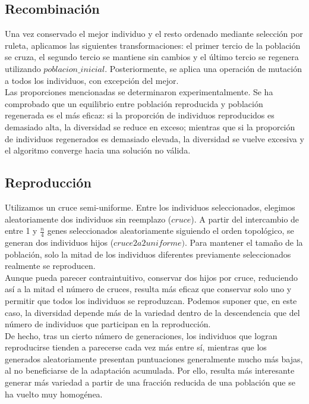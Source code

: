 \documentclass[12pt]{report}
\begin{document}
\subsection{Recombinación}

Una vez conservado el mejor individuo y el resto ordenado mediante selección por ruleta, aplicamos las siguientes transformaciones: el primer tercio de la población se cruza, el segundo tercio se mantiene sin cambios y el último tercio se regenera utilizando $poblacion\_inicial$.
Posteriormente, se aplica una operación de mutación a todos los individuos, con excepción del mejor.\\

Las proporciones mencionadas se determinaron experimentalmente. Se ha comprobado que un equilibrio entre población reproducida y población regenerada es el más eficaz: si la proporción de individuos reproducidos es demasiado alta, la diversidad se reduce en exceso; mientras que si la proporción de individuos regenerados es demasiado elevada, la diversidad se vuelve excesiva y el algoritmo converge hacia una solución no válida.

\subsection{Reproducción}

Utilizamos un cruce semi-uniforme. Entre los individuos seleccionados, elegimos aleatoriamente dos individuos sin reemplazo ($cruce$). A partir del intercambio de entre 1 y \( \frac{n}{4} \) genes seleccionados aleatoriamente siguiendo el orden topológico, se generan dos individuos hijos ($cruce2a2uniforme)$. Para mantener el tamaño de la población, solo la mitad de los individuos diferentes previamente seleccionados realmente se reproducen. \\

Aunque pueda parecer contraintuitivo, conservar dos hijos por cruce, reduciendo así a la mitad el número de cruces, resulta más eficaz que conservar solo uno y permitir que todos los individuos se reproduzcan. Podemos suponer que, en este caso, la diversidad depende más de la variedad dentro de la descendencia que del número de individuos que participan en la reproducción.\\
De hecho, tras un cierto número de generaciones, los individuos que logran reproducirse tienden a parecerse cada vez más entre sí, mientras que los generados aleatoriamente presentan puntuaciones generalmente mucho más bajas, al no beneficiarse de la adaptación acumulada. Por ello, resulta más interesante generar más variedad a partir de una fracción reducida de una población que se ha vuelto muy homogénea.\\
\end{document}
